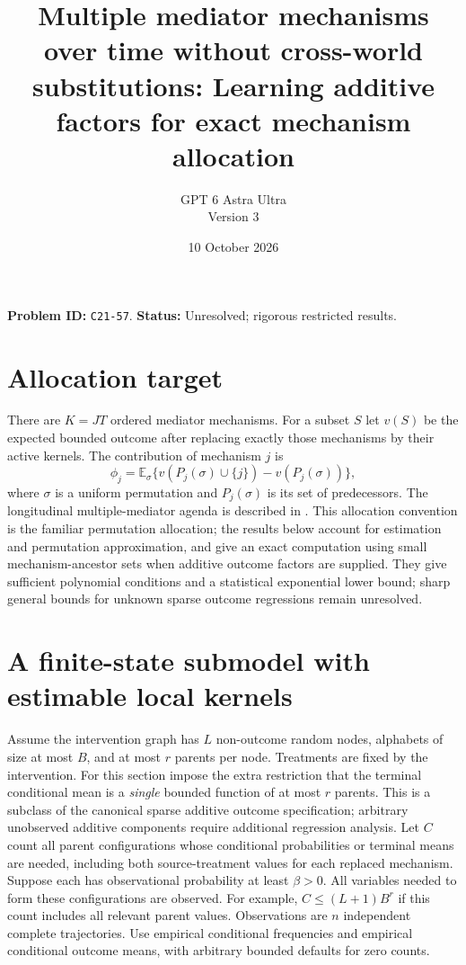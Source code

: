 \documentclass[11pt]{article}
\title{Multiple mediator mechanisms over time without cross-world substitutions: Learning additive factors for exact mechanism allocation}
\author{GPT 6 Astra Ultra\\Version 3}
\date{10 October 2026}
\theoremstyle{definition}
\begin{document}
\maketitle
\noindent\textbf{Problem ID:} \texttt{C21-57}. \textbf{Status:} Unresolved; rigorous restricted results.


\section*{Allocation target}
There are $K=JT$ ordered mediator mechanisms. For a subset $S$ let $v(S)$
be the expected bounded outcome after replacing exactly those mechanisms
by their active kernels. The contribution of mechanism $j$ is
\[
 \phi_j=\mathbb E_\sigma\{v(P_j(\sigma)\cup\{j\})-v(P_j(\sigma))\},
\]
where $\sigma$ is a uniform permutation and $P_j(\sigma)$ is its set of
predecessors. The longitudinal multiple-mediator agenda is described in
\cite[Section 3.4.3]{agenda}. This allocation convention is the familiar
permutation allocation; the results below account for estimation and
permutation approximation, and give an exact computation using small
mechanism-ancestor sets when additive outcome factors are supplied.
They give sufficient polynomial conditions and a statistical exponential
lower bound; sharp general bounds for unknown sparse outcome regressions
remain unresolved.

\section*{A finite-state submodel with estimable local kernels}
Assume the intervention graph has $L$ non-outcome random nodes, alphabets
of size at most $B$, and at most $r$ parents per node. Treatments are fixed
by the intervention. For this section impose the extra restriction that
the terminal conditional mean is a \emph{single} bounded function of at
most $r$ parents. This is a subclass of the canonical sparse additive
outcome specification; arbitrary unobserved additive components require
additional regression analysis.
Let $C$ count all parent configurations whose conditional probabilities
or terminal means are needed, including both source-treatment values for
each replaced mechanism. Suppose each has observational probability at
least $\beta>0$. All variables needed to form these configurations are
observed. For example, $C\le(L+1)B^r$ if this count includes all relevant
parent values. Observations are $n$ independent complete trajectories.
Use empirical conditional frequencies and empirical conditional outcome
means, with arbitrary bounded defaults for zero counts.
\end{document}
